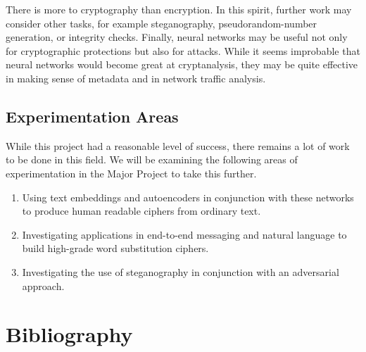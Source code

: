 \documentclass[a4paper]{article}
\begin{document}
    There is more to cryptography than encryption. In this spirit, further work may consider other tasks,
    for example steganography, pseudorandom-number generation, or integrity checks. Finally, neural
    networks may be useful not only for cryptographic protections but also for attacks. While it seems
    improbable that neural networks would become great at cryptanalysis, they may be quite effective
    in making sense of metadata and in network traffic analysis.

    \subsection{Experimentation Areas}
    While this project had a reasonable level of success, there remains a lot of work to be done
    in this field. We will be examining the following areas of experimentation in the Major Project
    to take this further.
    \begin{enumerate}
      \item Using text embeddings and autoencoders in conjunction with these networks to produce 
      human readable ciphers from ordinary text.
      \item Investigating applications in end-to-end messaging and natural language to build 
      high-grade word substitution ciphers.
      \item Investigating the use of steganography in conjunction with an adversarial approach.
    \end{enumerate}

  \newpage
  \section*{Bibliography}
  
  
  \listoffigures
\end{document}
